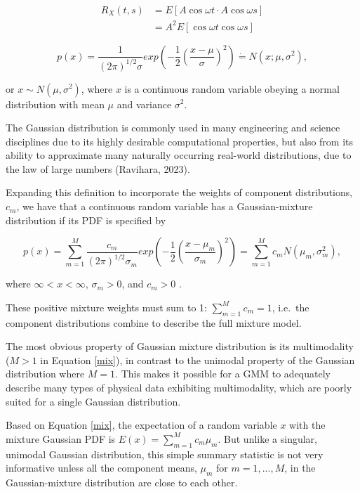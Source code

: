 \documentclass[12pt]{article}
\begin{document}
\begin{align} R_X(t, s) &= E[A \cos \omega t \cdot A \cos \omega s] \\ &= A^2 E[\cos \omega t \cos \omega s] \end{align}

\begin{equation}
\label{single}
p(x) = \frac{1}{(2\pi)^{1/2} \sigma} exp(-\frac{1}{2}(\frac{x-\mu}{\sigma})^2) \dot{=} N(x; \mu, \sigma^2),
\end{equation}

or \(x \sim N(\mu, \sigma^2)\), where \(x\) is a continuous random
variable obeying a normal distribution with mean \(\mu\) and variance
\(\sigma^2\).

The Gaussian distribution is commonly used in many engineering and
science disciplines due to its highly desirable computational
properties, but also from its ability to approximate many naturally
occurring real-world distributions, due to the law of large numbers
(Ravihara, 2023).

Expanding this definition to incorporate the weights of component
distributions, \(c_m\), we have that a continuous random variable has a
Gaussian-mixture distribution if its PDF is specified by

\begin{equation}
\label{mix}
p(x) = \sum_{m=1}^M \frac{c_m}{(2\pi)^{1/2} \sigma_m} exp(-\frac{1}{2}(\frac{x-\mu_m}{\sigma_m})^2) = \sum_{m=1}^M c_m N(\mu_m, \sigma_m^2),
\end{equation}

where \(\infty < x < \infty\), \(\sigma_m > 0\), and \(c_m > 0\)
\citep{yu2015gaussian}.

These positive mixture weights must sum to 1: \(\sum_{m=1}^M c_m = 1\),
i.e.~the component distributions combine to describe the full mixture
model.

The most obvious property of Gaussian mixture distribution is its
multimodality (\(M>1\) in Equation \ref{mix}), in contrast to the
unimodal property of the Gaussian distribution where \(M=1\). This makes
it possible for a GMM to adequately describe many types of physical data
exhibiting multimodality, which are poorly suited for a single Gaussian
distribution.

Based on Equation \ref{mix}, the expectation of a random variable \(x\)
with the mixture Gaussian PDF is \(E(x) = \sum_{m=1}^M c_m \mu_m\). But
unlike a singular, unimodal Gaussian distribution, this simple summary
statistic is not very informative unless all the component means,
\(\mu_m\) for \(m = 1, ..., M\), in the Gaussian-mixture distribution
are close to each other.
\end{document}
